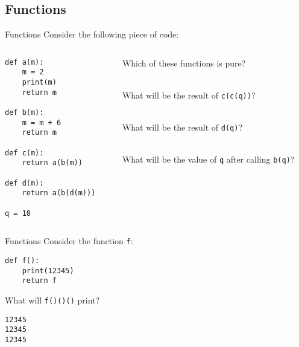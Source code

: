 \documentclass[9pt]{beamer}
\begin{document}
\subsection{Functions}
\begin{frame}[fragile]{Functions}
  Consider the following piece of code:
  \begin{columns}
    \begin{column}{0.5\textwidth}
      \begin{lstlisting}
def a(m):
    m = 2
    print(m)
    return m

def b(m):
    m = m + 6
    return m

def c(m):
    return a(b(m))

def d(m):
    return a(b(d(m)))

q = 10
    \end{lstlisting}
  \end{column}
  \begin{column}{0.5\textwidth}
    Which of these functions is pure? \\
     \\\vspace{1cm}

    What will be the result of {\tt c(c(q))}? \\
     \\\vspace{1cm}

    What will be the result of {\tt d(q)}? \\
     \\\vspace{1cm}

    What will be the value of {\tt q} after calling {\tt b(q)}? \\
  \end{column}
\end{columns}
\end{frame}

\begin{frame}[fragile]{Functions}
  Consider the function {\tt f}:
  \begin{lstlisting}
def f():
    print(12345)
    return f
  \end{lstlisting}

  What will {\tt f()()()} print?
  \pause
  \begin{lstlisting}[numbers=none, frame=none, xleftmargin=0pt]
12345
12345
12345
  \end{lstlisting}
\end{frame}
\end{document}
